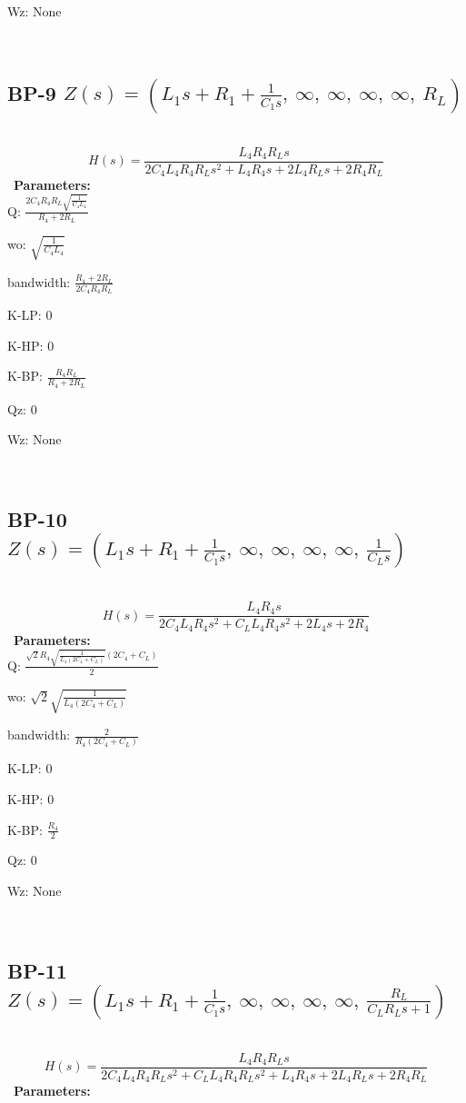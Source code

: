 \documentclass{article}
\begin{document}
Wz: $\text{None}$\ 

\ 

\subsection{BP-9 $Z(s) = \left( L_{1} s + R_{1} + \frac{1}{C_{1} s}, \  \infty, \  \infty, \  \infty, \  \infty, \  R_{L}\right)$ } \ 
\textbf{\[H(s) = \frac{L_{4} R_{4} R_{L} s}{2 C_{4} L_{4} R_{4} R_{L} s^{2} + L_{4} R_{4} s + 2 L_{4} R_{L} s + 2 R_{4} R_{L}}\] } \ 
\textbf{Parameters:}\\ 

Q: $\frac{2 C_{4} R_{4} R_{L} \sqrt{\frac{1}{C_{4} L_{4}}}}{R_{4} + 2 R_{L}}$\ 

wo: $\sqrt{\frac{1}{C_{4} L_{4}}}$\ 

bandwidth: $\frac{R_{4} + 2 R_{L}}{2 C_{4} R_{4} R_{L}}$\ 

K-LP: $0$\ 

K-HP: $0$\ 

K-BP: $\frac{R_{4} R_{L}}{R_{4} + 2 R_{L}}$\ 

Qz: $0$\ 

Wz: $\text{None}$\ 

\ 

\subsection{BP-10 $Z(s) = \left( L_{1} s + R_{1} + \frac{1}{C_{1} s}, \  \infty, \  \infty, \  \infty, \  \infty, \  \frac{1}{C_{L} s}\right)$ } \ 
\textbf{\[H(s) = \frac{L_{4} R_{4} s}{2 C_{4} L_{4} R_{4} s^{2} + C_{L} L_{4} R_{4} s^{2} + 2 L_{4} s + 2 R_{4}}\] } \ 
\textbf{Parameters:}\\ 

Q: $\frac{\sqrt{2} R_{4} \sqrt{\frac{1}{L_{4} \left(2 C_{4} + C_{L}\right)}} \left(2 C_{4} + C_{L}\right)}{2}$\ 

wo: $\sqrt{2} \sqrt{\frac{1}{L_{4} \left(2 C_{4} + C_{L}\right)}}$\ 

bandwidth: $\frac{2}{R_{4} \left(2 C_{4} + C_{L}\right)}$\ 

K-LP: $0$\ 

K-HP: $0$\ 

K-BP: $\frac{R_{4}}{2}$\ 

Qz: $0$\ 

Wz: $\text{None}$\ 

\ 

\subsection{BP-11 $Z(s) = \left( L_{1} s + R_{1} + \frac{1}{C_{1} s}, \  \infty, \  \infty, \  \infty, \  \infty, \  \frac{R_{L}}{C_{L} R_{L} s + 1}\right)$ } \ 
\textbf{\[H(s) = \frac{L_{4} R_{4} R_{L} s}{2 C_{4} L_{4} R_{4} R_{L} s^{2} + C_{L} L_{4} R_{4} R_{L} s^{2} + L_{4} R_{4} s + 2 L_{4} R_{L} s + 2 R_{4} R_{L}}\] } \ 
\textbf{Parameters:}\\ 
\end{document}
